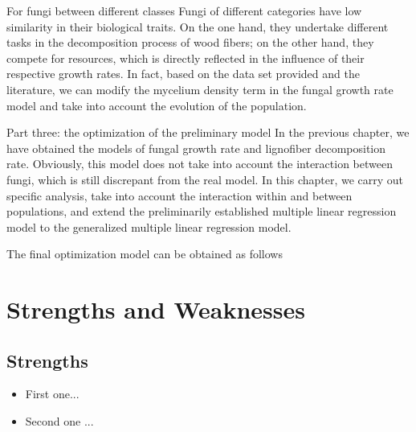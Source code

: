 \documentclass[12pt]{article}
\begin{document}
	
	For fungi between different classes
	Fungi of different categories have low similarity in their biological traits. On the one hand, they undertake different tasks in the decomposition process of wood fibers; on the other hand, they compete for resources, which is directly reflected in the influence of their respective growth rates.
	In fact, based on the data set provided and the literature, we can modify the mycelium density term in the fungal growth rate model and take into account the evolution of the population.
	
	
	Part three: the optimization of the preliminary model
	In the previous chapter, we have obtained the models of fungal growth rate and lignofiber decomposition rate. Obviously, this model does not take into account the interaction between fungi, which is still discrepant from the real model.
	In this chapter, we carry out specific analysis, take into account the interaction within and between populations, and extend the preliminarily established multiple linear regression model to the generalized multiple linear regression model.
	
	
	The final optimization model can be obtained as follows
	
	
	
	
	
	
	
	
	
	
	
	
	
	
	
	
	
	
	
	
	
	
	
	
	
	
	
	
	
	
	
	
	
	
	
	
	
	
	
	
	
	
	
	
	
	\section{Strengths and Weaknesses}
	\subsection{Strengths}
	\begin{itemize}
		\item First one...
		\item Second one ...
	\end{itemize}
	
\end{document}
